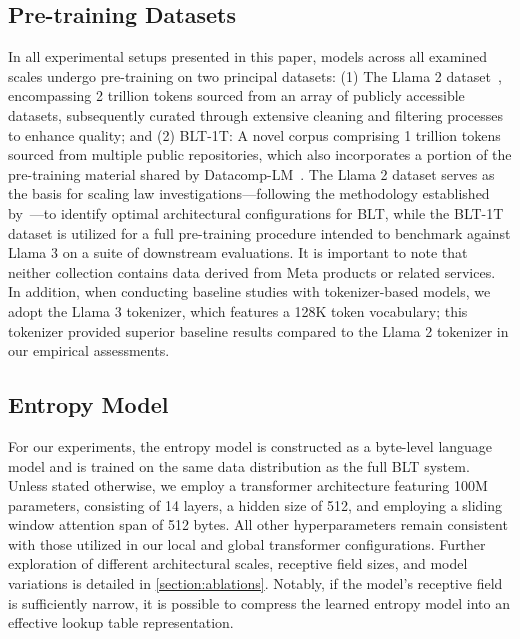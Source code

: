 \subsection{Pre-training Datasets} In all experimental setups presented in this paper, models across all examined scales undergo pre-training on two principal datasets: (1) The Llama 2 dataset~\citep{touvron2023llama}, encompassing 2 trillion tokens sourced from an array of publicly accessible datasets, subsequently curated through extensive cleaning and filtering processes to enhance quality; and (2) {\textsc BLT}-1T: A novel corpus comprising 1 trillion tokens sourced from multiple public repositories, which also incorporates a portion of the pre-training material shared by Datacomp-LM~\citep{li2024datacomp}. The Llama 2 dataset serves as the basis for scaling law investigations—following the methodology established by~\cite{dubey2024llama}—to identify optimal architectural configurations for {\textsc BLT}, while the {\textsc BLT}-1T dataset is utilized for a full pre-training procedure intended to benchmark against Llama 3 on a suite of downstream evaluations. It is important to note that neither collection contains data derived from Meta products or related services. In addition, when conducting baseline studies with tokenizer-based models, we adopt the Llama 3 tokenizer, which features a 128K token vocabulary; this tokenizer provided superior baseline results compared to the Llama 2 tokenizer in our empirical assessments.

\subsection{Entropy Model} For our experiments, the entropy model is constructed as a byte-level language model and is trained on the same data distribution as the full {\textsc BLT} system. Unless stated otherwise, we employ a transformer architecture featuring 100M parameters, consisting of 14 layers, a hidden size of 512, and employing a sliding window attention span of 512 bytes. All other hyperparameters remain consistent with those utilized in our local and global transformer configurations. Further exploration of different architectural scales, receptive field sizes, and model variations is detailed in \autoref{section:ablations}. Notably, if the model’s receptive field is sufficiently narrow, it is possible to compress the learned entropy model into an effective lookup table representation.


